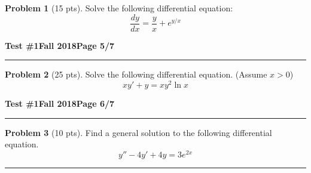 \documentclass[12pt]{article}
\theoremstyle{definition}
\newtheorem{problem}{Problem}
\begin{document}
\begin{problem}[15 pts]
  Solve the following differential equation:
  \begin{equation*}
    \frac{dy}{dx} = \frac{y}{x} + e^{y/x}
  \end{equation*}

  \vspace{7.5cm}
  \begin{flushright}
  \end{flushright}
\end{problem}
\newpage

\hfill{\large\bf Test \#1}\hfill{\large\bf Fall 2018}\hfill{\large\bf Page 5/7}\hrule

\bigskip

\begin{problem}[25 pts]
  Solve the following differential equation. (Assume $x>0$)
  \begin{equation*}
    xy' + y = xy^2 \ln x
  \end{equation*}

  \vspace{18cm}
  \begin{flushright}
  \end{flushright}
\end{problem}
\newpage

\hfill{\large\bf Test \#1}\hfill{\large\bf Fall 2018}\hfill{\large\bf Page 6/7}\hrule

\bigskip

\begin{problem}[10 pts]
  Find a general solution to the following differential equation.
  \begin{equation*}
    y''-4y'+4y=3e^{2x}
  \end{equation*}

  \vspace{6cm}
  \begin{flushright}
  \end{flushright}
\end{problem}
\hrule
\end{document}
